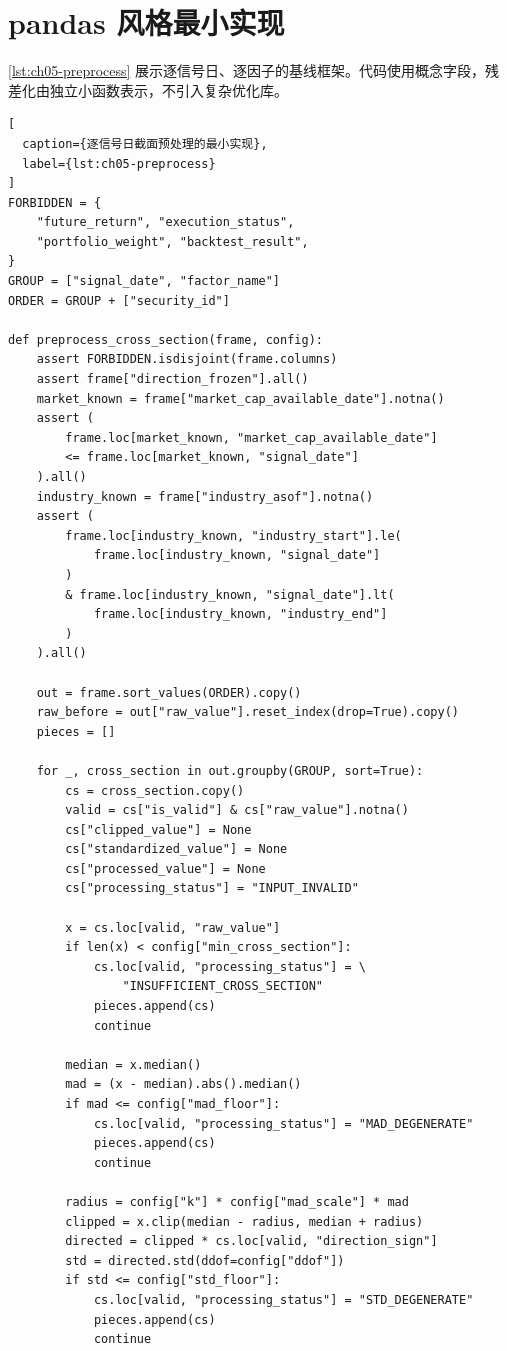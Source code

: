 \section{pandas 风格最小实现}

\cref{lst:ch05-preprocess} 展示逐信号日、逐因子的基线框架。代码使用概念字段，残差化由独立小函数表示，不引入复杂优化库。

\begin{lstlisting}[
  caption={逐信号日截面预处理的最小实现},
  label={lst:ch05-preprocess}
]
FORBIDDEN = {
    "future_return", "execution_status",
    "portfolio_weight", "backtest_result",
}
GROUP = ["signal_date", "factor_name"]
ORDER = GROUP + ["security_id"]

def preprocess_cross_section(frame, config):
    assert FORBIDDEN.isdisjoint(frame.columns)
    assert frame["direction_frozen"].all()
    market_known = frame["market_cap_available_date"].notna()
    assert (
        frame.loc[market_known, "market_cap_available_date"]
        <= frame.loc[market_known, "signal_date"]
    ).all()
    industry_known = frame["industry_asof"].notna()
    assert (
        frame.loc[industry_known, "industry_start"].le(
            frame.loc[industry_known, "signal_date"]
        )
        & frame.loc[industry_known, "signal_date"].lt(
            frame.loc[industry_known, "industry_end"]
        )
    ).all()

    out = frame.sort_values(ORDER).copy()
    raw_before = out["raw_value"].reset_index(drop=True).copy()
    pieces = []

    for _, cross_section in out.groupby(GROUP, sort=True):
        cs = cross_section.copy()
        valid = cs["is_valid"] & cs["raw_value"].notna()
        cs["clipped_value"] = None
        cs["standardized_value"] = None
        cs["processed_value"] = None
        cs["processing_status"] = "INPUT_INVALID"

        x = cs.loc[valid, "raw_value"]
        if len(x) < config["min_cross_section"]:
            cs.loc[valid, "processing_status"] = \
                "INSUFFICIENT_CROSS_SECTION"
            pieces.append(cs)
            continue

        median = x.median()
        mad = (x - median).abs().median()
        if mad <= config["mad_floor"]:
            cs.loc[valid, "processing_status"] = "MAD_DEGENERATE"
            pieces.append(cs)
            continue

        radius = config["k"] * config["mad_scale"] * mad
        clipped = x.clip(median - radius, median + radius)
        directed = clipped * cs.loc[valid, "direction_sign"]
        std = directed.std(ddof=config["ddof"])
        if std <= config["std_floor"]:
            cs.loc[valid, "processing_status"] = "STD_DEGENERATE"
            pieces.append(cs)
            continue


\end{lstlisting}
